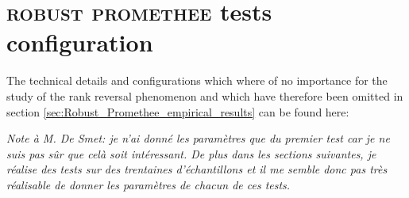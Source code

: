 \chapter{\textsc{robust promethee} tests configuration} \label{app:Robust_test_config}

The technical details and configurations which where of no importance for the study of the rank reversal phenomenon and which have therefore been omitted in section \ref{sec:Robust_Promethee_empirical_results} can be found here:

\textit{Note à M. De Smet: je n'ai donné les paramètres que du premier test car je ne suis pas sûr  que celà soit intéressant. De plus dans les sections suivantes, je réalise des tests sur des trentaines d'échantillons et il me semble donc pas très réalisable de donner les paramètres de chacun de ces tests.}

